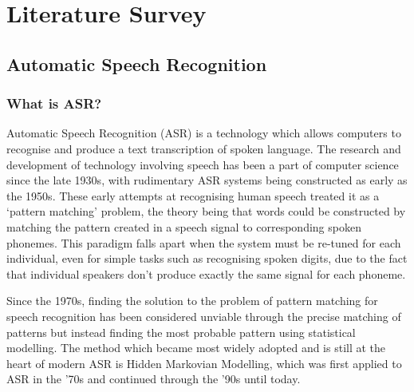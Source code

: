\chapter{Literature Survey}\label{ch:literature-survey}

\section{Automatic Speech Recognition}\label{sec:what-is-asr}

\subsection{What is ASR?}

Automatic Speech Recognition (ASR) is a technology which allows computers to recognise and produce a text transcription of spoken language.
The research and development of technology involving speech has been a part of computer science since the late 1930s\cite{Rabiner2004Jan,vocoder}, with rudimentary ASR systems being constructed as early as the 1950s\cite{asr-52}.
These early attempts at recognising human speech treated it as a `pattern matching' problem, the theory being that words could be constructed by matching the pattern created in a speech signal to corresponding spoken phonemes\cite{Rabiner2004Jan}. 
This paradigm falls apart when the system must be re-tuned for each individual, even for simple tasks such as recognising spoken digits\cite{asr-52}, due to the fact that individual speakers don't produce exactly the same signal for each phoneme\cite{Horton2010}.

Since the 1970s, finding the solution to the problem of pattern matching for speech recognition has been considered unviable through the precise matching of patterns but instead finding the most probable pattern using statistical modelling\cite{Rabiner2004Jan}.
The method which became most widely adopted and is still at the heart of modern ASR is Hidden Markovian Modelling, which was first applied to ASR in the '70s\cite{baker1975stochastic} and continued through the '90s\cite{bengio1999markovian} until today\cite{hmm2023}.

